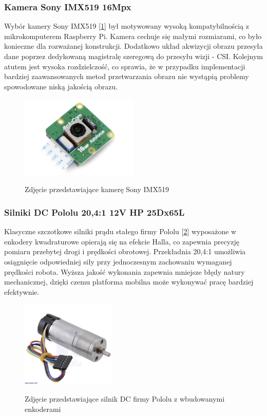 \subsubsection*{Kamera Sony IMX519 16Mpx}
Wybór kamery Sony IMX519 [\ref{zdj:kamera-sony}] był motywowany wysoką kompatybilnością z mikrokomputerem Raspberry Pi. Kamera cechuje się małymi rozmiarami, co było konieczne dla rozważanej konstrukcji. Dodatkowo układ akwizycji obrazu przesyła dane poprzez dedykowaną magistralę szeregową do przesyłu wizji - CSI. Kolejnym atutem jest wysoka rozdzielczość, co sprawia, że w przypadku implementacji bardziej zaawansowanych metod przetwarzania obrazu nie wystąpią problemy spowodowane niską jakością obrazu. 

\begin{figure}[h!]
        \centering
        \includegraphics[width=0.5\textwidth]{./graf/kamera-sony.png}
        \label{zdj:kamera-sony}
        \caption{Zdjęcie przedstawiające kamerę Sony IMX519}
\end{figure}

\subsubsection*{Silniki DC Pololu 20,4:1 12V HP 25Dx65L}
Klasyczne szczotkowe silniki prądu stałego firmy Pololu [\ref{zdj:silnik-pololu}] wyposażone w enkodery kwadraturowe opierają się na efekcie Halla, co zapewnia precyzję pomiaru przebytej drogi i prędkości obrotowej. Przekładnia 20,4:1 umożliwia osiągnięcie odpowiedniej siły przy jednoczesnym zachowaniu wymaganej prędkości robota. Wyższa jakość wykonania zapewnia mniejsze błędy natury mechanicznej, dzięki czemu platforma mobilna może wykonywać pracę bardziej efektywnie. 

\begin{figure}[h!]
        \centering
        \includegraphics[width=0.4\textwidth]{./graf/silnik-pololu.png}
        \label{zdj:silnik-pololu}
        \caption{Zdjęcie przedstawiające silnik DC firmy Pololu z wbudowanymi enkoderami}
\end{figure}

